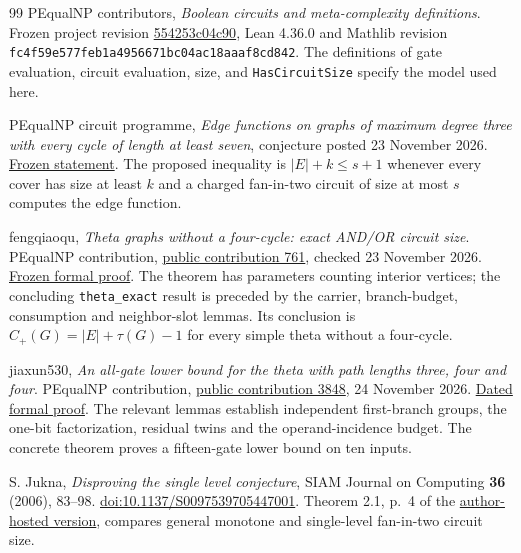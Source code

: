 \documentclass[11pt]{article}
\theoremstyle{definition}
\theoremstyle{remark}
\begin{document}
\begin{thebibliography}{99}
PEqualNP contributors, \emph{Boolean circuits and meta-complexity definitions}.
Frozen project revision
\href{https://github.com/brilliant-hq/pequalnp-proofs/tree/554253c04c90db722fc689346a6947081d8c4dbc}{554253c04c90},
Lean 4.36.0 and Mathlib revision
\texttt{fc4f59e577feb1a4956671bc04ac18aaaf8cd842}.
The definitions of gate evaluation, circuit evaluation, size, and
\texttt{HasCircuitSize} specify the model used here.

PEqualNP circuit programme, \emph{Edge functions on graphs of maximum degree
three with every cycle of length at least seven}, conjecture posted
23 November 2026.
\href{https://data.pequalnp.com/data/lemma/L-meta-519.ed26ac472458.json}{Frozen statement}.
The proposed inequality is $|E|+k\le s+1$ whenever every cover has size at
least $k$ and a charged fan-in-two circuit of size at most $s$ computes
the edge function.

fengqiaoqu, \emph{Theta graphs without a four-cycle: exact AND/OR circuit size}.
PEqualNP contribution,
\href{https://github.com/brilliant-hq/pequalnp-proofs/pull/761}{public contribution 761},
checked 23 November 2026.
\href{https://github.com/brilliant-hq/pequalnp-proofs/blob/554253c04c90db722fc689346a6947081d8c4dbc/lean/PEqualNP/Outside/L_meta_615.lean}{Frozen formal proof}.
The theorem has parameters counting interior vertices; the concluding
\texttt{theta\_exact} result is preceded by the carrier, branch-budget,
consumption and neighbor-slot lemmas. Its conclusion is
$C_+(G)=|E|+\tau(G)-1$ for every simple theta without a four-cycle.

jiaxun530, \emph{An all-gate lower bound for the theta with path lengths
three, four and four}.
PEqualNP contribution,
\href{https://github.com/brilliant-hq/pequalnp-proofs/pull/3848}{public contribution 3848},
24 November 2026.
\href{https://github.com/brilliant-hq/pequalnp-proofs/blob/f5238c8b9a5fe0bb379403d109cc933ea1e8302b/lean/PEqualNP/Outside/L_meta_1549.lean}{Dated formal proof}.
The relevant lemmas establish independent first-branch groups, the
one-bit factorization, residual twins and the operand-incidence budget.
The concrete theorem proves a fifteen-gate lower bound on ten inputs.

S. Jukna, \emph{Disproving the single level conjecture}, SIAM Journal on
Computing \textbf{36} (2006), 83--98.
\href{https://doi.org/10.1137/S0097539705447001}{doi:10.1137/S0097539705447001}.
Theorem 2.1, p.~4 of the
\href{https://web.vu.lt/mif/s.jukna/ftp/single1.pdf}{author-hosted version},
compares general monotone and single-level fan-in-two circuit size.


\end{thebibliography}
\end{document}
